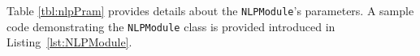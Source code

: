 \documentclass[a4paper,twoside,bibtotoc,abstracton,12pt,BCOR=15mm]{article}
\begin{document}
% 
% 
    Table \ref{tbl:nlpPram} provides details about the \texttt{NLPModule}'s parameters.
% 
    A sample code demonstrating the \texttt{NLPModule} class is provided introduced in Listing~\ref{lst:NLPModule}.
\end{document}

